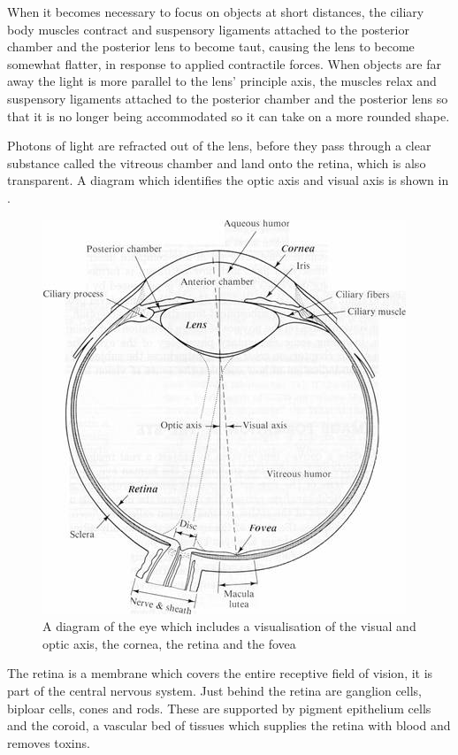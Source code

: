When it becomes necessary to focus on objects at short distances, the
ciliary body muscles contract and suspensory ligaments attached to the
posterior chamber and the posterior lens to become taut, causing the
lens to become somewhat flatter, in response to applied contractile
forces. When objects are far away the light
is more parallel to the lens' principle axis, the muscles relax and
suspensory ligaments attached to the posterior chamber and the posterior
lens so that it is no longer being accommodated so it can take on a more
rounded shape.

Photons of light are refracted out of the lens, before they pass through
a clear substance called the vitreous chamber and land onto the retina,
which is also transparent. A diagram which identifies the optic axis
and visual axis is shown in .

\begin{figure}[htbp]
  \centering
    \includegraphics{figures/eye_diagram}
  \caption{A diagram of the eye which includes a visualisation of the visual
   and optic axis, the cornea, the retina and the fovea}
  \label{fig:optic_axis}
\end{figure}

The retina is a membrane which covers the entire receptive field of vision,
it is part of the central nervous system.\cite{rogers1983neurite} Just behind
the retina are ganglion cells, biploar cells, cones and rods. These are supported
by pigment epithelium cells and the coroid, a vascular bed of tissues which
supplies the retina with blood and removes toxins.\cite{lutty1996localization}

